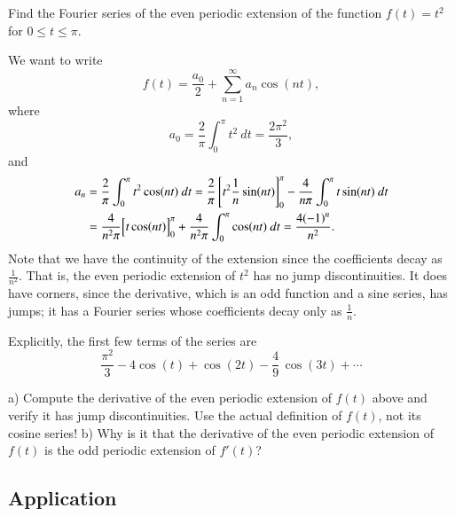 
\begin{example}
Find the Fourier series of the even periodic extension of 
the function $f(t) = t^2$ for $0 \leq t \leq \pi$.

We want to write
\begin{equation*}
f(t) = \frac{a_0}{2} + \sum_{n=1}^\infty a_n \cos (n t) ,
\end{equation*}
where
\begin{equation*}
a_0 = \frac{2}{\pi}
\int_0^\pi t^2 ~ dt = \frac{2 \pi^2}{3} ,
\end{equation*}
and
\begin{equation*}
\begin{split}
a_n & = \frac{2}{\pi}
\int_0^\pi t^2 \cos (n t) ~ dt
= \frac{2}{\pi} \left[ t^2 \frac{1}{n} \sin (nt) \right]_0^\pi -
\frac{4}{n\pi}
\int_0^\pi t \sin (n t) ~ dt \\
& = 
\frac{4}{n^2\pi}
\Bigl[ t \cos (n t) \Bigr]_0^\pi
+
\frac{4}{n^2\pi}
\int_0^\pi \cos (n t) ~ dt
= 
\frac{4{(-1)}^n}{n^2} .
\end{split}
\end{equation*}
Note that we have  the continuity of the extension since the
coefficients decay as $\frac{1}{n^2}$.  That is, the even periodic extension
of $t^2$ has no jump discontinuities.  It does have corners, since
the derivative, which is an odd function and a sine series, has jumps; it has
a Fourier series whose coefficients decay only as $\frac{1}{n}$.

Explicitly, the first few terms of the series are
\begin{equation*}
\frac{\pi^2}{3} - 4 \cos (t) + \cos (2t) - \frac{4}{9}\, \cos (3t) + \cdots
\end{equation*}
\end{example}

\begin{exercise}
a) Compute the derivative of the even periodic extension of $f(t)$ above and verify it
has jump discontinuities.  Use the actual definition of $f(t)$, not its cosine
series!  b) Why is it that the derivative of the even periodic extension of $f(t)$ is the
odd periodic extension of $f'(t)$?
\end{exercise}

\subsection{Application}


